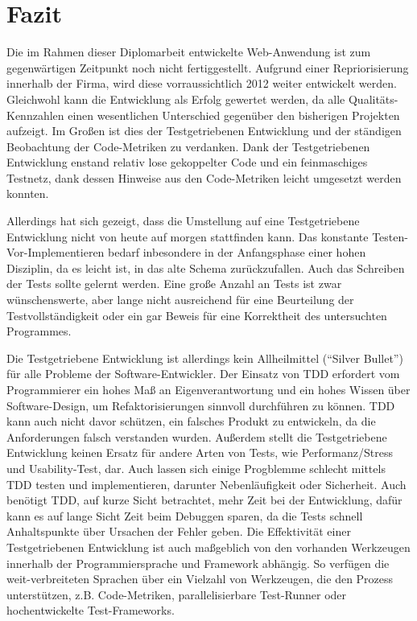\chapter{Fazit}
\label{sec:fazit}

Die im Rahmen dieser Diplomarbeit entwickelte Web-Anwendung ist zum gegenwärtigen Zeitpunkt noch nicht fertiggestellt. Aufgrund einer Repriorisierung innerhalb der Firma, wird diese vorraussichtlich 2012 weiter entwickelt werden. Gleichwohl kann die Entwicklung als Erfolg gewertet werden, da alle Qualitäts-Kennzahlen einen wesentlichen Unterschied gegenüber den bisherigen Projekten aufzeigt. Im Großen ist dies der Testgetriebenen Entwicklung und der ständigen Beobachtung der Code-Metriken zu verdanken. Dank der Testgetriebenen Entwicklung enstand relativ lose gekoppelter Code und ein feinmaschiges Testnetz, dank dessen Hinweise aus den Code-Metriken leicht umgesetzt werden konnten.

Allerdings hat sich gezeigt, dass die Umstellung auf eine Testgetriebene Entwicklung nicht von heute auf morgen stattfinden kann. Das 
konstante Testen-Vor\hyp{}Implementieren bedarf inbesondere in der Anfangsphase einer hohen Disziplin, da es leicht ist, in das alte Schema zurückzufallen. Auch das Schreiben der Tests sollte gelernt werden. Eine große Anzahl an Tests ist zwar wünschenswerte, aber lange nicht ausreichend für eine Beurteilung der Testvollständigkeit oder ein gar Beweis für eine Korrektheit des untersuchten Programmes. 

Die Testgetriebene Entwicklung ist allerdings kein Allheilmittel ("`Silver Bullet"') für alle Probleme der Software-Entwickler. Der Einsatz von TDD erfordert vom Programmierer ein hohes Maß an Eigenverantwortung und ein hohes Wissen über Software-Design, um Refaktorisierungen sinnvoll durchführen zu können. TDD kann auch nicht davor schützen, ein falsches Produkt zu entwickeln, da die Anforderungen falsch verstanden wurden. Außerdem stellt die Testgetriebene Entwicklung keinen Ersatz für andere Arten von Tests, wie Performanz/Stress und Usability-Test, dar. Auch lassen sich einige Progblemme schlecht mittels TDD testen und implementieren, darunter Nebenläufigkeit oder Sicherheit.  Auch benötigt TDD, auf kurze Sicht betrachtet, mehr Zeit bei der Entwicklung, dafür kann es auf lange Sicht Zeit beim Debuggen sparen, da die Tests schnell Anhaltspunkte über Ursachen der Fehler geben.
Die Effektivität einer Testgetriebenen Entwicklung ist auch maßgeblich von den vorhanden Werkzeugen innerhalb der Programmiersprache und Framework abhängig. So verfügen die weit-verbreiteten Sprachen über ein Vielzahl von Werkzeugen, die den Prozess unterstützen, z.B. Code-Metriken, parallelisierbare Test-Runner oder hochentwickelte Test-Frameworks.

